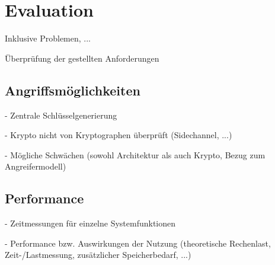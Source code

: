 \section{Evaluation}

\label{sec_impl_evaluation}

Inklusive Problemen, ...

Überprüfung der gestellten Anforderungen

\subsection{Angriffsmöglichkeiten}

- Zentrale Schlüsselgenerierung

- Krypto nicht von Kryptographen überprüft (Sidechannel, ...)

- Mögliche Schwächen (sowohl Architektur als auch Krypto, Bezug zum Angreifermodell)

\subsection{Performance}

- Zeitmessungen für einzelne Systemfunktionen

- Performance bzw. Auswirkungen der Nutzung (theoretische Rechenlast, Zeit-/Lastmessung, zusätzlicher Speicherbedarf, ...)